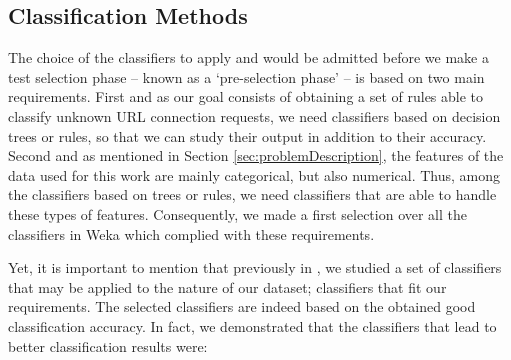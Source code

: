 \documentclass{llncs}
\begin{document}
%
\subsection{Classification Methods}
\label{subsec:methods}

\noindent The choice of the classifiers to apply and would be admitted
before we make a test selection phase -- known as a `pre-selection
phase' -- is based on two main requirements. First and as our goal
consists of obtaining a set of rules able to classify unknown URL
connection requests,  we need classifiers based on decision trees or
rules, so that we can study their output in addition to their
accuracy. Second and as mentioned in Section
\ref{sec:problemDescription}, the features of the data used for this
work are mainly categorical, but also numerical. Thus, among the
classifiers based on trees or rules, we need classifiers that are able
to handle these types of features. Consequently, we made a first
selection over all the classifiers in Weka which complied with these
requirements.

Yet, it is important to mention that previously in \cite{ECTA}, we studied a set of classifiers that may be applied to the nature of our dataset; classifiers that fit our requirements. The selected classifiers are indeed based on the obtained good classification accuracy. In fact, we demonstrated that the classifiers that lead to better classification results were:
\end{document}
